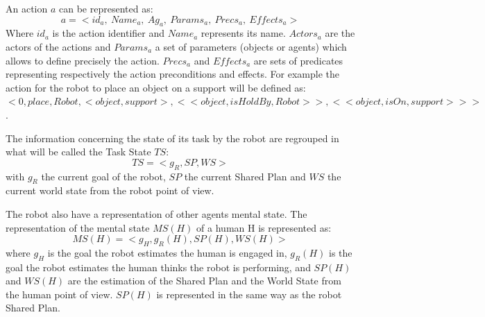 \documentclass[english,a4paper,11pt,twoside]{StyleThese}
\begin{document}
An action $a$ can be represented as: 
$$a = < id_{a}, \ Name_{a}, \ Ag_{a}, \ Params_{a}, \ Precs_{a}, \ Effects_{a} >$$
Where $id_{a}$ is the action identifier and $Name_{a}$ represents its name. $Actors_{a}$ are the actors of the actions and $Params_{a}$ a set of parameters (objects or agents) which allows to define precisely the action. $Precs_{a}$ and $Effects_{a}$ are sets of predicates representing respectively the action preconditions and effects.
For example the action for the robot to place an object on a support will be defined as:$<0, place, Robot, <object, support>, <<object, isHoldBy, Robot>>, <<object, isOn, support>>>$.

The information concerning the state of its task by the robot are regrouped in what will be called the Task State $TS$:
$$TS = <g_R, SP, WS>$$
with $g_R$ the current goal of the robot, $SP$ the current Shared Plan and $WS$ the current world state from the robot point of view.

The robot also have a representation of other agents mental state. The representation of the mental state $MS(H)$ of a human H is represented as:
$$MS(H) = <g_H, g_R(H), SP(H), WS(H)>$$
where $g_H$ is the goal the robot estimates the human is engaged in, $g_R(H)$ is the goal the robot estimates the human thinks the robot is performing, and $SP(H)$ and $WS(H)$ are the estimation of the Shared Plan and the World State from the human point of view.
$SP(H)$ is represented in the same way as the robot Shared Plan.


\ifdefined{}
\else


\end{document}
